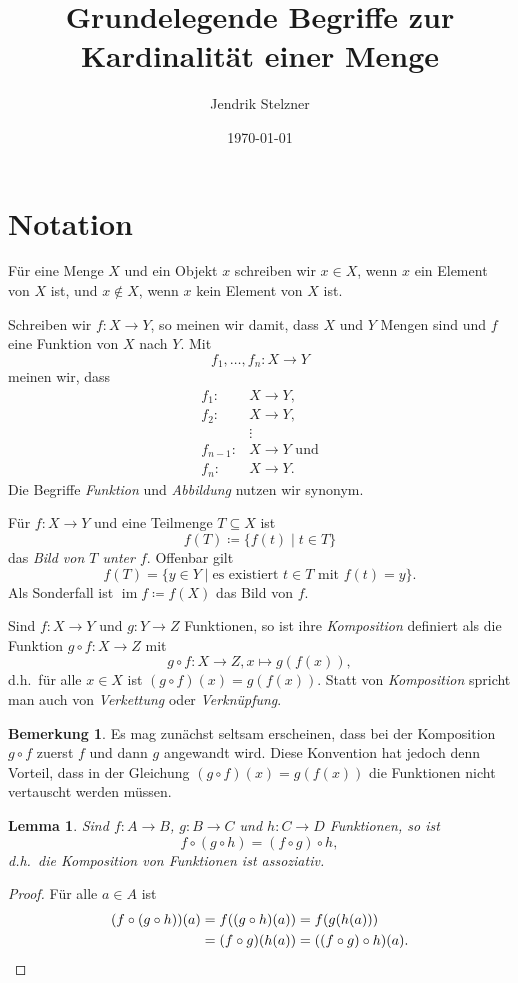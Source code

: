 \documentclass[a4paper,10pt]{article}
\title{Grundelegende Begriffe zur Kardinalität einer Menge}
\author{Jendrik Stelzner}
\date{\today}
\newcounter{propositions}
\newtheorem{lem}[propositions]{Lemma}
\theoremstyle{definition}
\newtheorem*{bem}{Bemerkung}
\DeclareMathOperator{\im}{im}
\begin{document}
\maketitle

\tableofcontents





\section{Notation}
Für eine Menge $X$ und ein Objekt $x$ schreiben wir $x \in X$, wenn $x$ ein Element von $X$ ist, und $x \notin X$, wenn $x$ kein Element von $X$ ist.

Schreiben wir $f \colon X \to Y$, so meinen wir damit, dass $X$ und $Y$ Mengen sind und $f$ eine Funktion von $X$ nach $Y$. Mit
\[
 f_1, \dotsc, f_n \colon X \to Y
\]
meinen wir, dass
\begin{align*}
     f_1 \colon &X \to Y, \\
     f_2 \colon &X \to Y, \\
                &\vdots \\
 f_{n-1} \colon &X \to Y \text{ und} \\
     f_n \colon &X \to Y.
\end{align*}
Die Begriffe \emph{Funktion} und \emph{Abbildung} nutzen wir synonym.

Für $f \colon X \to Y$ und eine Teilmenge $T \subseteq X$ ist
\[
 f(T)
 \coloneqq \{f(t) \mid t \in T\}
\]
das \emph{Bild von $T$ unter $f$}. Offenbar gilt
\[
 f(T) = \{y \in Y \mid \text{es existiert $t \in T$ mit $f(t) = y$}\}.
\]
Als Sonderfall ist $\im f \coloneqq f(X)$ das Bild von $f$.

Sind $f \colon X \to Y$ und $g \colon Y \to Z$ Funktionen, so ist ihre \emph{Komposition} definiert als die Funktion $g \circ f \colon X \to Z$ mit
\[
 g \circ f \colon X \to Z, x \mapsto g(f(x)),
\]
d.h.\ für alle $x \in X$ ist $(g \circ f)(x) = g(f(x))$. Statt von \emph{Komposition} spricht man auch von \emph{Verkettung} oder \emph{Verknüpfung}.

\begin{bem}
 Es mag zunächst seltsam erscheinen, dass bei der Komposition $g \circ f$ zuerst $f$ und dann $g$ angewandt wird. Diese Konvention hat jedoch denn Vorteil, dass in der Gleichung $(g \circ f)(x) = g(f(x))$ die Funktionen nicht vertauscht werden müssen.
\end{bem}

\begin{lem}
 Sind $f \colon A \to B$, $g \colon B \to C$ und $h \colon C \to D$ Funktionen, so ist
 \[
  f \circ (g \circ h) = (f \circ g) \circ h,
 \]
 d.h.\ die Komposition von Funktionen ist assoziativ.
\end{lem}
\begin{proof}
 Für alle $a \in A$ ist
 \begin{align*}
  (f \circ (g \circ h))(a)
  &= f((g \circ h)(a))
  = f(g(h(a))) \\
  &= (f \circ g)(h(a))
  = ((f \circ g) \circ h)(a).
  \qedhere
 \end{align*}
\end{proof}
\end{document}
